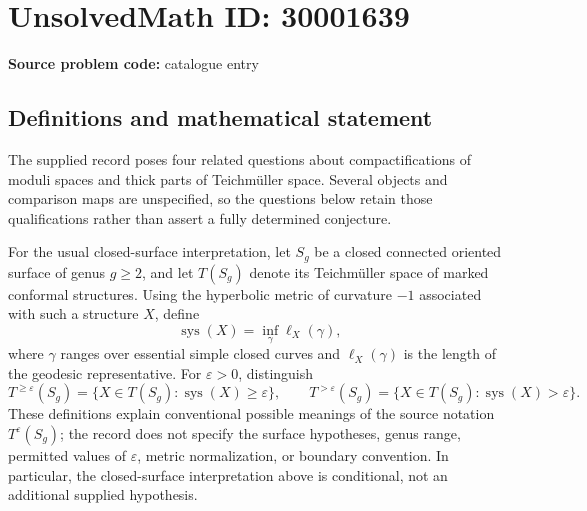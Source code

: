 \documentclass[11pt]{article}
\begin{document}
\section*{UnsolvedMath ID: 30001639}
\textbf{Source problem code:} catalogue entry
\subsection{Definitions and mathematical statement}
The supplied record poses four related questions about compactifications of moduli spaces and thick parts of Teichmüller space. Several objects and comparison maps are unspecified, so the questions below retain those qualifications rather than assert a fully determined conjecture.

For the usual closed-surface interpretation, let \(S_g\) be a closed connected oriented surface of genus \(g\geq 2\), and let \(T(S_g)\) denote its Teichmüller space of marked conformal structures. Using the hyperbolic metric of curvature \(-1\) associated with such a structure \(X\), define
\[
\operatorname{sys}(X)=\inf_{\gamma}\ell_X(\gamma),
\]
where \(\gamma\) ranges over essential simple closed curves and \(\ell_X(\gamma)\) is the length of the geodesic representative. For \(\varepsilon>0\), distinguish
\[
T^{\geq\varepsilon}(S_g)=\{X\in T(S_g):\operatorname{sys}(X)\geq\varepsilon\},\qquad
T^{>\varepsilon}(S_g)=\{X\in T(S_g):\operatorname{sys}(X)>\varepsilon\}.
\]
These definitions explain conventional possible meanings of the source notation \(T^\varepsilon(S_g)\); the record does not specify the surface hypotheses, genus range, permitted values of \(\varepsilon\), metric normalization, or boundary convention. In particular, the closed-surface interpretation above is conditional, not an additional supplied hypothesis.
\end{document}
